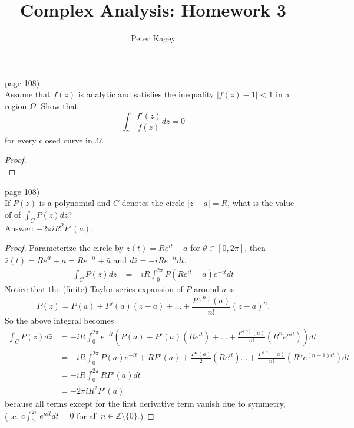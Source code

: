 \documentclass{article}
\newenvironment{problem}[2][Problem]{\begin{trivlist}
\item[\hskip \labelsep {\bfseries #1}\hskip \labelsep {\bfseries #2.}]}{\end{trivlist}}
\begin{document}
\title{Complex Analysis: Homework 3}
\author{Peter Kagey}

\maketitle

\begin{problem}{6} (page 108) \\
  Assume that $f(z)$ is analytic and satisfies the inequality $|f(z)-1| < 1$ in
  a region $\Omega$. Show that \[
    \int_\gamma \frac{f'(z)}{f(z)}dz = 0
  \] for every closed curve in $\Omega$.
\end{problem}

\begin{proof} \text{} \\
\end{proof}
\pagebreak

\begin{problem}{7} (page 108) \\
  If $P(z)$ is a polynomial and $C$ denotes the circle $|z-a| = R$,
  what is the value of of $\displaystyle \int_C P(z) d\bar{z}$?\\
  Answer: $-2\pi iR^2P'(a)$.
\end{problem}

\begin{proof}
  Parameterize the circle by $z(t) = Re^{it} + a$ for $\theta \in [0, 2\pi]$,
  then $\bar{z}(t) = \overline{Re^{it} + a} = Re^{-it} + \bar{a}$ and
  $d\bar{z} = -iRe^{-it} dt$.
  \begin{align*}
    \int_C P(z) d\bar{z} &= -iR\int_{0}^{2\pi} P(Re^{it} + a)e^{-it} dt
  \end{align*}
  Notice that the (finite) Taylor series expansion of $P$ around $a$ is \[
    P(z) = P(a) + P'(a)(z-a) + \hdots + \frac{P^{(n)}(a)}{n!}(z - a)^n.
  \]
  So the above integral becomes \begin{align*}
    \int_C P(z) d\bar{z} &= -iR\int_{0}^{2\pi} e^{-it} \left(P(a) + P'(a)(Re^{it}) + \hdots + \frac{P^{(n)}(a)}{n!}(R^{n}e^{nit})\right) dt \\
    &= -iR\int_{0}^{2\pi} P(a)e^{-it} + RP'(a) + \frac{P''(a)}{2}(Re^{it}) \hdots + \frac{P^{(n)}(a)}{n!}(R^{n}e^{(n - 1)it}) dt \\
    &= -iR\int_{0}^{2\pi} RP'(a) dt \\
    &= -2\pi iR^2P'(a)
  \end{align*} because all terms except for the first derivative term vanish due
  to symmetry, (i.e. $c\int_0^{2\pi}e^{nit} dt = 0$ for all
  $n \in \mathbb{Z} \setminus \{0\}$.)
\end{proof}
\pagebreak
\end{document}
